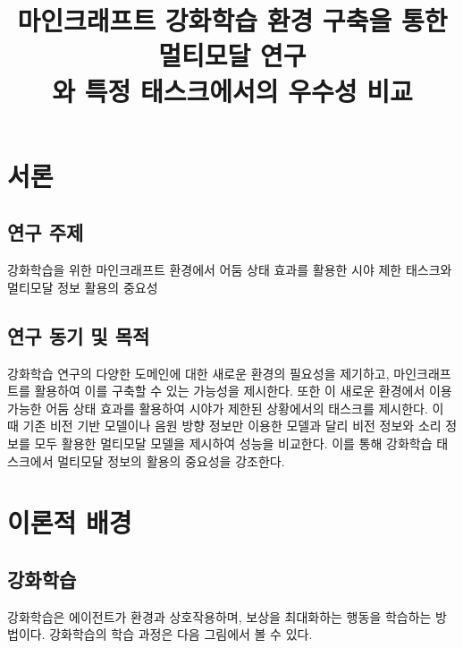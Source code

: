 \documentclass{tudelftposter}
\title{마인크래프트 강화학습 환경 구축을 통한 멀티모달 연구\\
\large 와 특정 태스크에서의 우수성 비교}
\begin{document}
\section{서론}
\subsection{연구 주제}
강화학습을 위한 마인크래프트 환경에서 어둠 상태 효과를 활용한 시야 제한 태스크와 멀티모달 정보 활용의 중요성

\subsection{연구 동기 및 목적}
강화학습 연구의 다양한 도메인에 대한 새로운 환경의 필요성을 제기하고, 마인크래프트를 활용하여 이를 구축할 수 있는 가능성을 제시한다. 또한 이 새로운 환경에서 이용 가능한 어둠 상태 효과를 활용하여 시야가 제한된 상황에서의 태스크를 제시한다. 이 때 기존 비전 기반 모델이나 음원 방향 정보만 이용한 모델과 달리 비전 정보와 소리 정보를 모두 활용한 멀티모달 모델을 제시하여 성능을 비교한다. 이를 통해 강화학습 태스크에서 멀티모달 정보의 활용의 중요성을 강조한다.

\section{이론적 배경}
\subsection{강화학습}
강화학습은 에이전트가 환경과 상호작용하며, 보상을 최대화하는 행동을 학습하는 방법이다. 강화학습의 학습 과정은 다음 그림에서 볼 수 있다.
\end{document}
